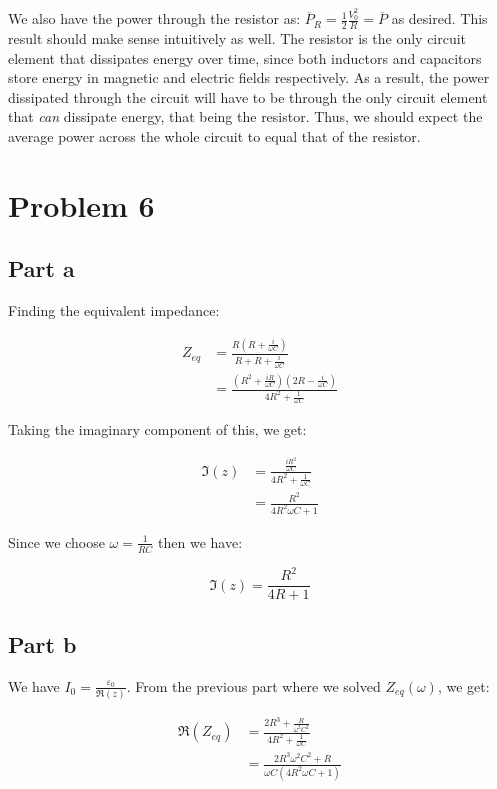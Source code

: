 \documentclass{article}
\theoremstyle{definition}
\numberwithin{equation}{section}
\numberwithin{definition}{section}
\begin{document}
We also have the power through the resistor as: $\overline P_R = \frac{1}{2}\frac{V_0^2}{R} = \overline P$ as desired. This result should make sense intuitively as well. The resistor is the only circuit element that dissipates energy over time, since both inductors and capacitors store energy in magnetic and electric fields respectively. As a result, the power dissipated through the circuit will have to be through the only circuit element that \textit{can} dissipate energy, that being the resistor. Thus, we should expect the average power across the whole circuit to equal that of the resistor.
\section{Problem 6}

\subsection{Part a}
Finding the equivalent impedance: 

\begin{align*}
    Z_{eq} &= \frac{R\left(R + \frac{i}{\omega C}\right)}{R + R + \frac{i}{\omega C}}\\
    &= \frac{\left(R^2 + \frac{iR}{\omega C}\right) \left(2R - \frac{i}{\omega C}\right)}{4R^2 + \frac{1}{\omega C}}
\end{align*}

Taking the imaginary component of this, we get:

\begin{align*}
    \Im(z) &= \frac{\frac{iR^2}{\omega C}}{4R^2 + \frac{1}{\omega C}}\\
    &= \frac{R^2}{4R^2 \omega C + 1}
\end{align*}

Since we choose $\omega = \frac{1}{RC}$ then we have:

\[ \Im(z) = \frac{R^2}{4R + 1}\]

\subsection{Part b}

We have $I_0 = \frac{\varepsilon_0}{\Re(z)}$. From the previous part where we solved $Z_{eq}(\omega)$, we get:

\begin{align*}
    \Re(Z_{eq}) &= \frac{2R^3 + \frac{R}{\omega^2C^2}}{4R^2 + \frac{1}{\omega C}}\\
    &= \frac{2R^3\omega^2C^2 + R}{\omega C(4R^2\omega C + 1)}
\end{align*}
\end{document}
